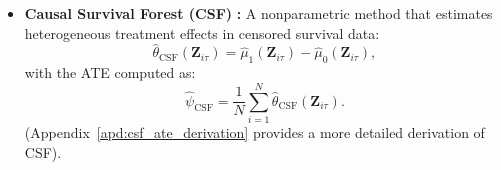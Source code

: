 \begin{itemize}[itemsep=0pt]
    \item \textbf{Causal Survival Forest (CSF)} \citep{cui2023estimating}\textbf{:} A nonparametric method that estimates heterogeneous treatment effects in censored survival data:
    \[
    \widehat{\theta}_{\text{CSF}}(\mathbf{Z}_{i\tau}) = \widehat{\mu}_1 (\mathbf{Z}_{i\tau}) - \widehat{\mu}_0 (\mathbf{Z}_{i\tau}),
    \]
    with the ATE computed as:
    \[
    \widehat{\psi}_{\text{CSF}} = \frac{1}{N} \sum_{i=1}^{N} \widehat{\theta}_{\text{CSF}}(\mathbf{Z}_{i\tau}).
    \]
    (Appendix~\ref{apd:csf_ate_derivation} provides a more detailed derivation of CSF).
\end{itemize}